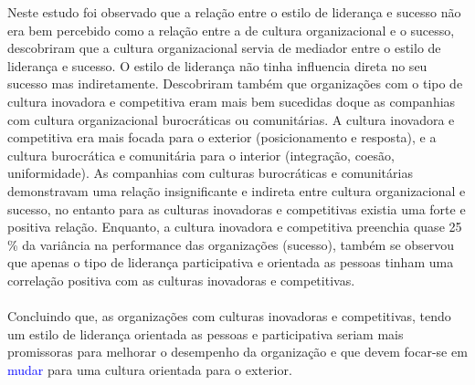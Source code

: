 Neste estudo foi observado que a relação entre o estilo de liderança e sucesso não era bem percebido como a relação entre a de cultura organizacional e o sucesso, descobriram que a cultura organizacional servia de mediador entre o estilo de liderança e sucesso. O estilo de liderança não tinha influencia direta no seu sucesso mas indiretamente. Descobriram também que organizações com o tipo de cultura inovadora e competitiva eram mais bem sucedidas doque as companhias com cultura organizacional burocráticas ou comunitárias. A cultura inovadora e competitiva era mais focada para o exterior (posicionamento e resposta), e a cultura burocrática e comunitária para o interior (integração, coesão, uniformidade). As companhias com culturas burocráticas e comunitárias demonstravam uma relação insignificante e indireta entre cultura organizacional e sucesso, no entanto para as culturas inovadoras e competitivas existia uma forte e positiva relação. Enquanto, a cultura inovadora e competitiva preenchia quase 25 \% da variância na performance das organizações (sucesso), também se observou que apenas o tipo de liderança participativa e orientada as pessoas tinham uma correlação positiva com as culturas inovadoras e competitivas.\\
\\
Concluindo que, as organizações com culturas inovadoras e competitivas, tendo um estilo de liderança orientada as pessoas e participativa seriam mais promissoras para melhorar o desempenho da organização e que devem focar-se em \textcolor{blue}{mudar} para uma cultura orientada para o exterior. \cite{article_1} \\
\newpage
